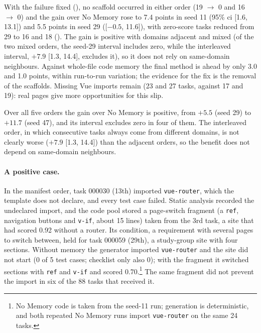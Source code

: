 With the failure fixed (), no scaffold occurred in either order (19 $\to$ 0 and 16 $\to$ 0) and the gain over No Memory rose to 7.4 points in seed 11 (95\% \gls{ci} [1.6, 13.1]) and 5.5 points in seed 29 ([$-0.5$, 11.6]), with zero-score tasks reduced from 29 to 16 and 18 (). The gain is positive with domains adjacent and mixed (of the two mixed orders, the seed-29 interval includes zero, while the interleaved interval, $+7.9$ [1.3, 14.4], excludes it), so it does not rely on same-domain neighbours. Against whole-file code memory the final method is ahead by only 3.0 and 1.0 points, within run-to-run variation; the evidence for the fix is the removal of the scaffolds. Missing Vue imports remain (23 and 27 tasks, against 17 and 19): real pages give more opportunities for this slip.



Over all five orders the gain over No Memory is positive, from $+5.5$ (seed 29) to $+11.7$ (seed 47), and its interval excludes zero in four of them. The interleaved order, in which consecutive tasks always come from different domains, is not clearly worse ($+7.9$ [1.3, 14.4]) than the adjacent orders, so the benefit does not depend on same-domain neighbours.

\paragraph{A positive case.} In the manifest order, task 000030 (13th) imported \texttt{vue-router}, which the template does not declare, and every test case failed. Static analysis recorded the undeclared import, and the code pool stored a page-switch fragment (a \texttt{ref}, navigation buttons and \texttt{v-if}, about 15 lines) taken from the 3rd task, a site that had scored 0.92 without a router. Its condition, a requirement with several pages to switch between, held for task 000059 (29th), a study-group site with four sections. Without memory the generator imported \texttt{vue-router} and the site did not start (0 of 5 test cases; checklist only also 0); with the fragment it switched sections with \texttt{ref} and \texttt{v-if} and scored 0.70.\footnote{No Memory code is taken from the seed-11 run; generation is deterministic, and both repeated No Memory runs import \texttt{vue-router} on the same 24 tasks.} The same fragment did not prevent the import in six of the 88 tasks that received it.

